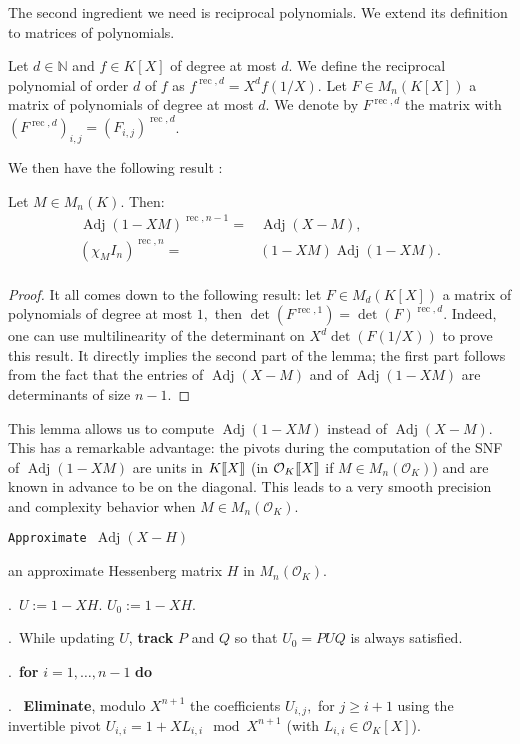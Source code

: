 \documentclass{sig-alternate-05-2015}
\DeclareMathOperator{\adj}{Adj}
\DeclareMathOperator{\rec}{rec}
\newcommand{\OK}{\mathcal{O}_K}
\newcommand{\llb}{[\mkern-2.5mu[}
\newcommand{\rrb}{]\mkern-2.5mu]}
\begin{document}
The second ingredient we need is reciprocal polynomials.
We extend its definition to matrices of polynomials.
\begin{deftn}
Let $d \in \mathbb{N}$ and $f \in K[X]$ of degree at most $d.$ 
We define the reciprocal polynomial of order $d$ of $f$ as $f^{\rec,d}=X^d f \left( 1/X \right).$
Let $F \in M_n(K[X])$ a matrix of polynomials of degree at most $d.$
We denote by $F^{\rec,d}$ the matrix with $(F^{\rec,d})_{i,j} = (F_{i,j})^{\rec,d}$.
\end{deftn}
We then have the following result :
\begin{lem}
Let $M \in M_n(K).$ Then:
\begin{eqnarray*}
\adj(1-XM)^{\rec,n-1}=&\adj(X-M), \\
(\chi_M I_n)^{\rec,n}=&(1-XM) \adj(1-XM).\\
\end{eqnarray*}
\end{lem}
\begin{proof}
It all comes down to the following result:
let $F \in M_d(K[X])$ a matrix of polynomials of degree at most $1,$
then $\det (F^{\rec,1})=\det(F)^{\rec,d}.$
Indeed, one can use multilinearity of the determinant on $X^d \det(F(1/X))$
to prove this result.
It directly implies the second part of the lemma; the first part follows
from the fact that the entries of $\adj(X-M)$ and of $\adj(1-XM)$
are determinants of size $n-1$.
\end{proof}

This lemma allows us to compute $\adj(1-XM)$ instead of $\adj(X-M).$
This has a remarkable advantage: the pivots during the computation of
the SNF of $\adj(1-XM)$ are units in $K\llb X\rrb$ (in $\OK\llb X\rrb$ if $M \in M_n(\OK)$) and are known
in advance to be on the diagonal. This leads to a very smooth
precision and complexity behavior when $M \in M_n(\OK).$ 

\noindent\hrulefill

 {\tt Approximate $\adj (X -H)$ }

 an approximate Hessenberg matrix $H$ in $M_n(\OK).$

\smallskip

.\ $U:=1-XH.$ $U_0:=1-XH.$

.\ While updating $U$, \textbf{track} $P$ and $Q$ so that $U_0=PUQ$ is always satisfied.

.\ {\bf for} $i=1,\dots,n-1$ {\bf do} 

.\  \:  \textbf{Eliminate}, modulo $X^{n+1}$ the coefficients $U_{i,j},$ for $j\geq i+1$ 
using the invertible pivot
$U_{i,i}=1+XL_{i,i} \mod X^{n+1}$ (with $L_{i,i} \in \OK[X]$). 
\end{document}

